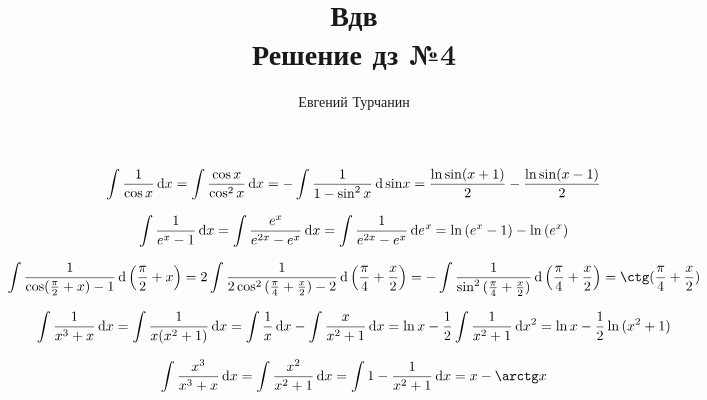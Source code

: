 \documentclass{report}
\title{\Huge{Вдв}\\ Решение дз №4}
\author{\huge{Евгений Турчанин}}
\date{}
\begin{document}
\maketitle

\sol
\begin{align*}
\displaystyle \int \dfrac{1}{\cos x} \dl x=\int \dfrac{\cos x}{\cos^2 x} \dl x
=-\int \dfrac{1}{1-\sin^2 x} \dl \sin x=\dfrac{\ln{\sin (x+1)}}{2}-\dfrac{\ln{\sin (x-1)}}{2}
\end{align*}

\sol
\begin{align*}
	\displaystyle \int \dfrac{1}{e^x-1} \dl x=\int \dfrac{e^x}{e^{2x}-e^x} \dl x=
	\int \dfrac{1}{e^{2x}-e^x} \dl e^x=\ln{(e^x-1)}-\ln{(e^x)}
\end{align*}

\sol
\begin{center}
\[
	\displaystyle \int \dfrac{1}{\cos (\frac{\pi}{2}+x) -1} \dl {\left(\frac{\pi}{2}+x\right)}=
	\displaystyle 2 \int \dfrac{1}{2\cos^2 {(\frac{\pi}{4}+\frac{x}{2})}-2} \dl {\left(\frac{\pi}{4}+\frac{x}{2}\right)}=
	\displaystyle  -\int \dfrac{1}{\sin^2 {(\frac{\pi}{4}+\frac{x}{2})}} \dl {\left(\frac{\pi}{4}+\frac{x}{2}\right)}=\ctg(\frac{\pi}{4}+\frac{x}{2})
\]
\end{center}


\sol
\begin{center}
\[
\displaystyle \int \dfrac{1}{x^3+x} \dl x=\displaystyle \int \dfrac{1}{x(x^2+1)} \dl x=
\displaystyle \int \dfrac{1}{x} \dl x-\int \dfrac{x}{x^2+1} \dl x=\ln x -\frac{1}{2}\int \dfrac{1}{x^2+1}\dl {x^2}=
\ln x -\frac{1}{2}\ln{(x^2+1)}
\]
\end{center}


\sol
\[
\displaystyle \int \dfrac{x^3}{x^3+x} \dl x=\displaystyle \int \dfrac{x^2}{x^2+1} \dl x=
\displaystyle \int 1-\dfrac{1}{x^2+1} \dl x=x-\arctg x
\]


\end{document}
